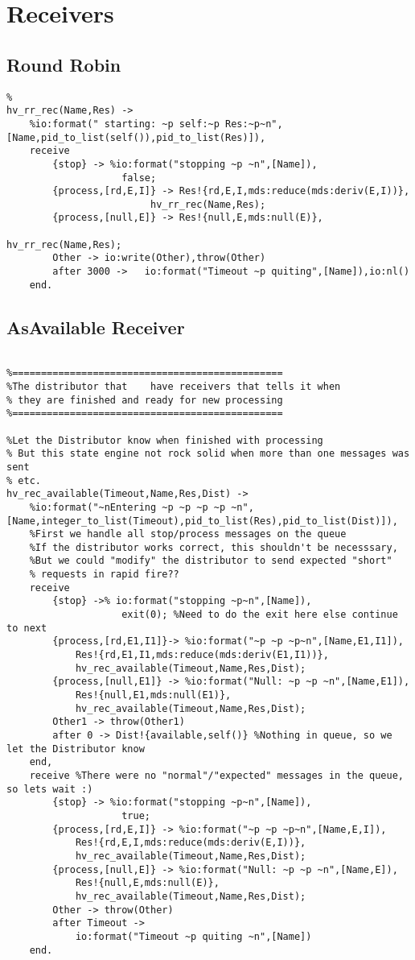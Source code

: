 \section{Receivers}

\subsection{Round Robin}
\begin{lstlisting}[name=hvp2]
%The receiver for the round robin/sequential tests
%
hv_rr_rec(Name,Res) -> 
	%io:format(" starting: ~p self:~p Res:~p~n",[Name,pid_to_list(self()),pid_to_list(Res)]),
	receive 
		{stop} -> %io:format("stopping ~p ~n",[Name]),
					false;
		{process,[rd,E,I]} -> Res!{rd,E,I,mds:reduce(mds:deriv(E,I))},
						 hv_rr_rec(Name,Res);
		{process,[null,E]} -> Res!{null,E,mds:null(E)},
													 hv_rr_rec(Name,Res);
		Other -> io:write(Other),throw(Other)
		after 3000 ->	io:format("Timeout ~p quiting",[Name]),io:nl()
	end.
\end{lstlisting}

\subsection{AsAvailable Receiver}
\begin{lstlisting}[name=hvp2]

%===============================================
%The distributor that	 have receivers that tells it when 
% they are finished and ready for new processing
%===============================================

%Let the Distributor know when finished with processing
% But this state engine not rock solid when more than one messages was sent 
% etc.
hv_rec_available(Timeout,Name,Res,Dist) ->
	%io:format("~nEntering ~p ~p ~p ~p ~n",[Name,integer_to_list(Timeout),pid_to_list(Res),pid_to_list(Dist)]),
	%First we handle all stop/process messages on the queue
	%If the distributor works correct, this shouldn't be necesssary,
	%But we could "modify" the distributor to send expected "short"
	% requests in rapid fire??
	receive
		{stop} ->% io:format("stopping ~p~n",[Name]),
					exit(0); %Need to do the exit here else continue to next
		{process,[rd,E1,I1]}-> %io:format("~p ~p ~p~n",[Name,E1,I1]),
			Res!{rd,E1,I1,mds:reduce(mds:deriv(E1,I1))},
			hv_rec_available(Timeout,Name,Res,Dist);
		{process,[null,E1]} -> %io:format("Null: ~p ~p ~n",[Name,E1]),
			Res!{null,E1,mds:null(E1)},
			hv_rec_available(Timeout,Name,Res,Dist);
		Other1 -> throw(Other1)
		after 0 -> Dist!{available,self()} %Nothing in queue, so we let the Distributor know
	end,
	receive %There were no "normal"/"expected" messages in the queue, so lets wait :)
		{stop} -> %io:format("stopping ~p~n",[Name]),
					true;
		{process,[rd,E,I]} -> %io:format("~p ~p ~p~n",[Name,E,I]),
			Res!{rd,E,I,mds:reduce(mds:deriv(E,I))},
			hv_rec_available(Timeout,Name,Res,Dist);
		{process,[null,E]} -> %io:format("Null: ~p ~p ~n",[Name,E]),
			Res!{null,E,mds:null(E)},
			hv_rec_available(Timeout,Name,Res,Dist);
		Other -> throw(Other)
		after Timeout ->
			io:format("Timeout ~p quiting ~n",[Name])
	end.

\end{lstlisting}

